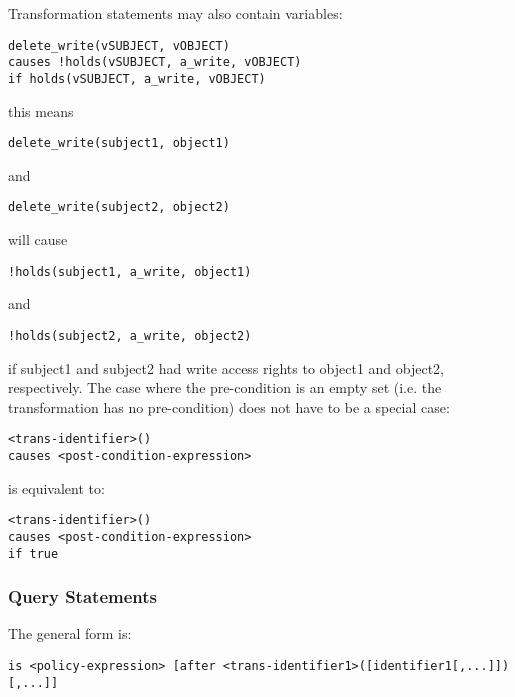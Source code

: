 \documentclass[a4paper]{article}
\begin{document}
        Transformation statements may also contain variables:

\begin{verbatim}
delete_write(vSUBJECT, vOBJECT)
causes !holds(vSUBJECT, a_write, vOBJECT)
if holds(vSUBJECT, a_write, vOBJECT)
\end{verbatim}
        this means

\begin{verbatim}
delete_write(subject1, object1)
\end{verbatim}

        and

\begin{verbatim}
delete_write(subject2, object2)
\end{verbatim}

        will cause

\begin{verbatim}
!holds(subject1, a_write, object1)
\end{verbatim}

        and

\begin{verbatim}
!holds(subject2, a_write, object2)
\end{verbatim}

        if subject1 and subject2 had write access rights to object1 and
        object2, respectively. The case where the pre-condition is an
        empty set (i.e. the transformation has no pre-condition) does not 
        have to be a special case:

\begin{verbatim}
<trans-identifier>()
causes <post-condition-expression>
\end{verbatim}

        is equivalent to:

\begin{verbatim}
<trans-identifier>()
causes <post-condition-expression>
if true
\end{verbatim}

      \subsubsection{Query Statements}

        The general form is:

\begin{verbatim}
is <policy-expression> [after <trans-identifier1>([identifier1[,...]])[,...]]
\end{verbatim}
\end{document}

